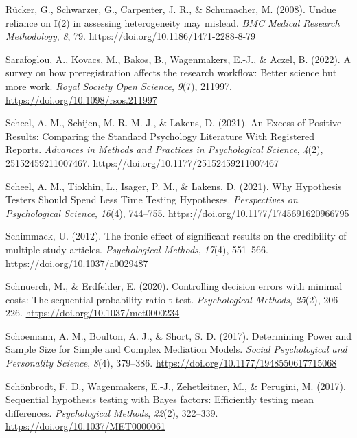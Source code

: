 \documentclass[
  oneside]{krantz}
\newlength{\cslhangindent}
\newlength{\cslentryspacingunit} %
\newenvironment{CSLReferences}[2] %
 {%
  \setlength{\parindent}{0pt}
  \ifodd #1
  \let\oldpar\par
  \def\par{\hangindent=\cslhangindent\oldpar}
  \fi
  \setlength{\parskip}{#2\cslentryspacingunit}
 }%
 {}
\begin{document}
\begin{CSLReferences}{1}{0}
\leavevmode{}%
Rücker, G., Schwarzer, G., Carpenter, J. R., \& Schumacher, M. (2008).
Undue reliance on {I}(2) in assessing heterogeneity may mislead.
\emph{BMC Medical Research Methodology}, \emph{8}, 79.
\url{https://doi.org/10.1186/1471-2288-8-79}

\leavevmode{}%
Sarafoglou, A., Kovacs, M., Bakos, B., Wagenmakers, E.-J., \& Aczel, B.
(2022). A survey on how preregistration affects the research workflow:
Better science but more work. \emph{Royal Society Open Science},
\emph{9}(7), 211997. \url{https://doi.org/10.1098/rsos.211997}

\leavevmode{}%
Scheel, A. M., Schijen, M. R. M. J., \& Lakens, D. (2021). An {Excess}
of {Positive Results}: {Comparing} the {Standard Psychology Literature
With Registered Reports}. \emph{Advances in Methods and Practices in
Psychological Science}, \emph{4}(2), 25152459211007467.
\url{https://doi.org/10.1177/25152459211007467}

\leavevmode{}%
Scheel, A. M., Tiokhin, L., Isager, P. M., \& Lakens, D. (2021). Why
{Hypothesis Testers Should Spend Less Time Testing Hypotheses}.
\emph{Perspectives on Psychological Science}, \emph{16}(4), 744--755.
\url{https://doi.org/10.1177/1745691620966795}

\leavevmode{}%
Schimmack, U. (2012). The ironic effect of significant results on the
credibility of multiple-study articles. \emph{Psychological Methods},
\emph{17}(4), 551--566. \url{https://doi.org/10.1037/a0029487}

\leavevmode{}%
Schnuerch, M., \& Erdfelder, E. (2020). Controlling decision errors with
minimal costs: {The} sequential probability ratio t test.
\emph{Psychological Methods}, \emph{25}(2), 206--226.
\url{https://doi.org/10.1037/met0000234}

\leavevmode{}%
Schoemann, A. M., Boulton, A. J., \& Short, S. D. (2017). Determining
{Power} and {Sample Size} for {Simple} and {Complex Mediation Models}.
\emph{Social Psychological and Personality Science}, \emph{8}(4),
379--386. \url{https://doi.org/10.1177/1948550617715068}

\leavevmode{}%
Schönbrodt, F. D., Wagenmakers, E.-J., Zehetleitner, M., \& Perugini, M.
(2017). Sequential hypothesis testing with {Bayes} factors:
{Efficiently} testing mean differences. \emph{Psychological Methods},
\emph{22}(2), 322--339. \url{https://doi.org/10.1037/MET0000061}


\end{CSLReferences}
\end{document}
